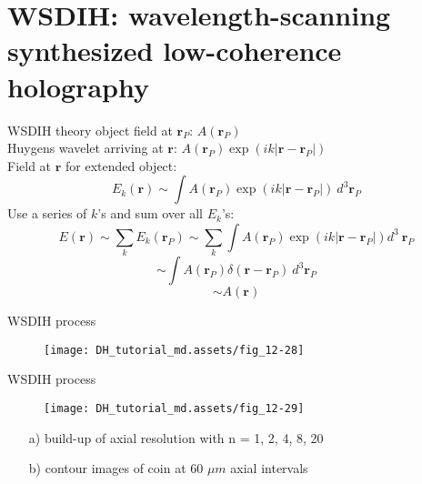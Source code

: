 \documentclass[t, aspectratio=169]{beamer}
\begin{document}
\section{WSDIH: wavelength-scanning synthesized low-coherence holography}
\begin{frame}[c]
	\centering\LARGE\textbf{\secname}
\end{frame}


\begin{frame}{WSDIH theory}
object field at $\mathbf r_P$: $ A(\mathbf r_P) $ \\
Huygens wavelet arriving at $\mathbf r$: $ A(\mathbf r_P)\exp(ik|\mathbf r - \mathbf r_P|) $ \\
Field at $\mathbf r$ for extended object: 
\[ E_k(\mathbf r) \sim \int A(\mathbf r_P)\exp(ik|\mathbf r - \mathbf r_P|)\ d^3\mathbf r_P \]
Use a series of $k$'s and sum over all $E_k$'s: 
\[ E(\mathbf r) \sim \sum_k E_k(\mathbf r_P) \sim \sum_k \int A(\mathbf r_P)\exp(ik|\mathbf r - \mathbf r_P|)d^3\ \mathbf r_P \]
\[ \sim \int A(\mathbf r_P)\delta(\mathbf r - \mathbf r_P)\ d^3\mathbf r_P \]
\[ \sim A(\mathbf r) \]
\end{frame}


\begin{frame}{WSDIH process}
	\begin{figure}
		\texttt{[image: DH\_tutorial\_md.assets/fig\_12-28]}
	\end{figure}
\end{frame}


\begin{frame}{WSDIH process}
	\begin{figure}
		\texttt{[image: DH\_tutorial\_md.assets/fig\_12-29]}
	\end{figure}
	\begin{itemize}
 		\setlength{\itemindent}{15 mm}
		\item[a) ] build-up of axial resolution with n = 1, 2, 4, 8, 20
		\item[b) ] contour images of coin at 60 $\mu m$ axial intervals
	\end{itemize}
\end{frame}




\end{document}
